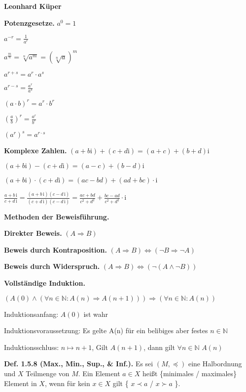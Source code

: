\documentclass[ngerman]{article}
\begin{document}
\begin{multicols}{4}
\begin{tiny}

\textbf{Leonhard Küper}

\textbf{Potenzgesetze.} 
$a^{0}=1$

$a^{-r}=\frac{1}{a^{r}}$

$a^{\frac{m}{n}}=\sqrt[n]{a^{m}}=\left(\sqrt[n]{a}\right)^{m}$

$a^{r+s}=a^{r}\cdot a^{s}$

$a^{r-s}=\frac{a^{r}}{a^{s}}$

$(a\cdot b)^{r}=a^{r}\cdot b^{r}$

$\left(\frac{a}{b}\right)^{r}=\frac{a^{r}}{b^{r}}$

$\left(a^{r}\right)^{s}=a^{r\cdot s}$

\textbf{Komplexe Zahlen.} $(a+b\mathrm i)+(c+d\mathrm i)=(a+c)+(b+d)\mathrm i$

$(a + b \mathrm i) - (c + d \mathrm i) = (a - c) + (b - d) \mathrm i$

$(a+b\mathrm{i})\cdot(c+d\mathrm{i})=(ac-bd) + (ad+bc)\cdot\mathrm i$

$\frac{a+b\,\mathrm i}{c+d\,\mathrm i} = \frac{(a+b\,\mathrm i)(c-d\,\mathrm i)}{(c+d\,\mathrm i)(c-d\,\mathrm i)} = \frac{ac+bd}{c^2+d^2}+\frac{bc-ad}{c^2+d^2}\cdot\mathrm i$

\textbf{Methoden der Beweisführung.}

\textbf{Direkter Beweis.} $(A \Rightarrow B)$

\textbf{Beweis durch Kontraposition.} $(A \Rightarrow B) \Leftrightarrow (\neg B \Rightarrow \neg A)$

\textbf{Beweis durch Widerspruch.} $(A \Rightarrow B ) \Leftrightarrow (\neg (A \wedge \neg B))$

\textbf{Vollständige Induktion.}

$(A(0) \wedge ( \forall  n \in \mathbb N : A(n) \Rightarrow A(n+1))) \Rightarrow \left(\forall n \in \mathbb N \colon A(n)\right)$

Induktionsanfang: $A(0)$ ist wahr

Induktionsvoraussetzung: Es gelte A(n) für ein belibiges aber festes $n \in \mathbb N$

Induktionsschluss: $n \mapsto n+1$, Gilt $A(n+1)$, dann gilt  $\forall n \in \mathbb{N}$ $A(n)$

\textbf{Def. 1.5.8 (Max., Min., Sup., \& Inf.).} Es sei $(M,\preceq)$ eine Halbordnung und $X$ Teilmenge von $M$. Ein Element $a\in X$ heißt \{minimales / maximales\} Element in $X$, wenn für kein $x\in X$ gilt \{ $x\prec a$ / $x \succ a$ \}.


\end{tiny}
\end{multicols}
\end{document}
